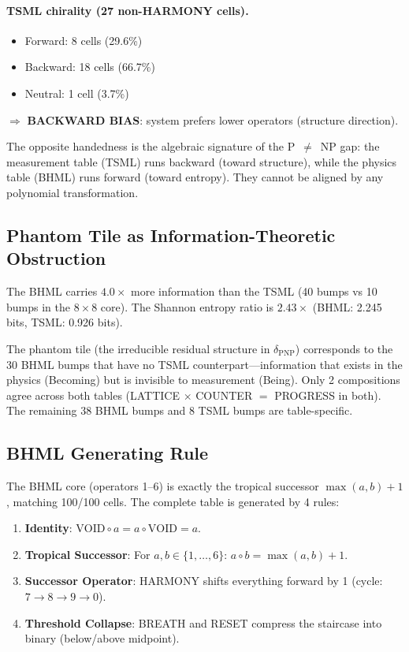 \documentclass[11pt]{article}
\theoremstyle{definition}
\theoremstyle{remark}
\begin{document}
\paragraph{TSML chirality (27 non-HARMONY cells).}
\begin{itemize}
  \item Forward: 8 cells (29.6\%)
  \item Backward: 18 cells (66.7\%)
  \item Neutral: 1 cell (3.7\%)
\end{itemize}
$\Rightarrow$ \textbf{BACKWARD BIAS}: system prefers lower operators (structure direction).

The opposite handedness is the algebraic signature of the
P~$\neq$~NP gap: the measurement table (TSML) runs backward (toward
structure), while the physics table (BHML) runs forward (toward entropy).
They cannot be aligned by any polynomial transformation.

\subsection{Phantom Tile as Information-Theoretic Obstruction}

The BHML carries $4.0\times$ more information than the TSML (40 bumps
vs 10 bumps in the $8\times 8$ core).  The Shannon entropy ratio is
$2.43\times$ (BHML: 2.245 bits, TSML: 0.926 bits).

The phantom tile (the irreducible residual structure in
$\delta_{\mathrm{PNP}}$) corresponds to the 30 BHML bumps that have
no TSML counterpart---information that exists in the physics (Becoming)
but is invisible to measurement (Being).  Only 2 compositions agree
across both tables (LATTICE $\times$ COUNTER $=$ PROGRESS in both).
The remaining 38 BHML bumps and 8 TSML bumps are table-specific.

\subsection{BHML Generating Rule}

The BHML core (operators 1--6) is exactly the tropical successor
$\max(a,b) + 1$, matching 100/100 cells.  The complete table is
generated by 4 rules:

\begin{enumerate}
  \item \textbf{Identity}: $\mathrm{VOID} \circ a = a \circ \mathrm{VOID} = a$.
  \item \textbf{Tropical Successor}: For $a,b \in \{1,\ldots,6\}$:
        $a \circ b = \max(a,b) + 1$.
  \item \textbf{Successor Operator}: HARMONY shifts everything forward
        by 1 (cycle: $7 \to 8 \to 9 \to 0$).
  \item \textbf{Threshold Collapse}: BREATH and RESET compress the
        staircase into binary (below/above midpoint).
\end{enumerate}
\end{document}
